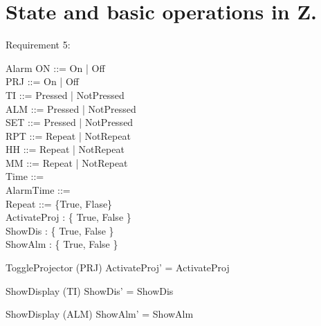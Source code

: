 \documentclass[Main_Assignment2]{subfiles}
\begin{document}
\section{State and basic operations in Z.}

Requirement 5:

\begin{schema}{Alarm}
ON ::= On | Off  \\
PRJ ::= On | Off \\
TI ::= Pressed | NotPressed \\
ALM ::= Pressed | NotPressed \\
SET ::= Pressed | NotPressed \\
RPT ::= Repeat | NotRepeat \\
HH ::= Repeat | NotRepeat \\
MM ::= Repeat | NotRepeat \\
Time ::=  \\
AlarmTime ::=  \\
Repeat ::= \{True, Flase\} \\
ActivateProj : \{ True, False \} \\
ShowDis : \{ True, False \} \\
ShowAlm : \{ True, False \}
\end{schema}




\begin{schema}{ToggleProjector} %
\Delta (PRJ) 
\where
ActivateProj' = ActivateProj 
\end{schema}


\begin{schema}{ShowDisplay} %
\Delta (TI)
\where
ShowDis' = ShowDis 
\end{schema}


\begin{schema}{ShowDisplay} %
\Delta (ALM)
\where
ShowAlm' = ShowAlm 
\end{schema}
\end{document}
